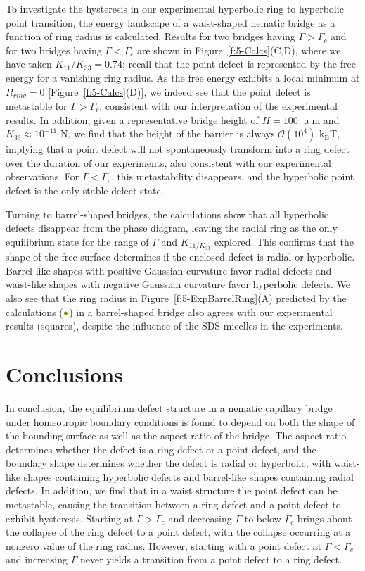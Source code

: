 To investigate the hysteresis in our experimental hyperbolic ring to hyperbolic point transition, the energy landscape of a waist-shaped nematic bridge as a function of ring radius is calculated.
Results for two bridges having $\Gamma > \Gamma_c$ and for two bridges having $\Gamma < \Gamma_c$ are shown in Figure~\ref{f:5-Calcs}(C,D), where we have taken $K_{11}/K_{33} = 0.74$; recall that the point defect is represented by the free energy for a vanishing ring radius.
As the free energy exhibits a local minimum at $R_{ring} = 0$ [Figure~\ref{f:5-Calcs}(D)], we indeed see that the point defect is metastable for $\Gamma > \Gamma_c$, consistent with our interpretation of the experimental results.
In addition, given a representative bridge height of $H = 100$ $\upmu$m and $K_{33} \approx 10^{-11}$ N, we find that the height of the barrier is always $\mathcal{O} \left ( 10^{4} \right )$ k$_\textrm{B}$T, implying that a point defect will not spontaneously transform into a ring defect over the duration of our experiments, also consistent with our experimental observations.
For $\Gamma < \Gamma_c$, this metastability disappears, and the hyperbolic point defect is the only stable defect state.

Turning to barrel-shaped bridges, the calculations show that all hyperbolic defects disappear from the phase diagram, leaving the radial ring as the only equilibrium state for the range of $\Gamma$ and $K_{11/K_{33}}$ explored.
This confirms that the shape of the free surface determines if the enclosed defect is radial or hyperbolic.
Barrel-like shapes with positive Gaussian curvature favor radial defects and waist-like shapes with negative Gaussian curvature favor hyperbolic defects.
We also see that the ring radius in Figure~\ref{f:5-ExpBarrelRing}(A) predicted by the calculations (${\color{olive} \bullet}$) in a barrel-shaped bridge also agrees with our experimental results (squares), despite the influence of the SDS micelles in the experiments.




\section{Conclusions}
In conclusion, the equilibrium defect structure in a nematic capillary bridge under homeotropic boundary conditions is found to depend on both the shape of the bounding surface as well as the aspect ratio of the bridge.
The aspect ratio determines whether the defect is a ring defect or a point defect, and the boundary shape determines whether the defect is radial or hyperbolic, with waist-like shapes containing hyperbolic defects and barrel-like shapes containing radial defects.
In addition, we find that in a waist structure the point defect can be metastable,  causing the transition between a ring defect and a point defect to exhibit hysteresis.
Starting at $\Gamma > \Gamma_c$ and decreasing $\Gamma$ to below $\Gamma_c$ brings about the collapse of the ring defect to a point defect, with the collapse occurring at a nonzero value of the ring radius.
However, starting with a point defect at $\Gamma < \Gamma_c$ and increasing $\Gamma$ never yields a transition from a point defect to a ring defect.

